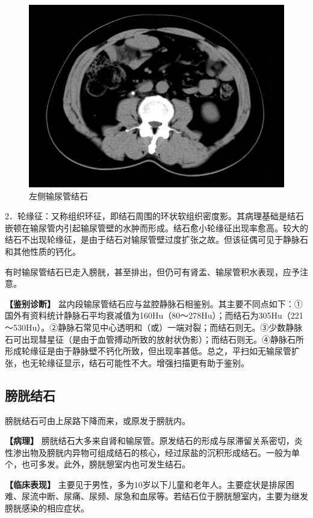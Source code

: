 \begin{figure}[!htbp]
 \centering
 \includegraphics[width=.7\textwidth,height=\textheight,keepaspectratio]{./images/Image00324.jpg}
 \captionsetup{justification=centering}
 \caption{左侧输尿管结石}
 \label{fig15-9}
  \end{figure} 

2．轮缘征：又称组织环征，即结石周围的环状软组织密度影。其病理基础是结石嵌顿在输尿管内引起输尿管壁的水肿而形成。结石愈小轮缘征出现率愈高。较大的结石不出现轮缘征，是由于结石对输尿管壁过度扩张之故。但该征偶可见于静脉石和其他性质的钙化。

有时输尿管结石已走入膀胱，甚至排出，但仍可有肾盂、输尿管积水表现，应予注意。

\textbf{【鉴别诊断】}
盆内段输尿管结石应与盆腔静脉石相鉴别。其主要不同点如下：①国外有资料统计静脉石平均衰减值为160Hu（80～278Hu）；而结石为305Hu（221～530Hu）。②静脉石常见中心透明和（或）一端对裂；而结石则无。③少数静脉石可出现彗星征（是由于血管搏动所致的放射状伪影）；而结石则无。④静脉石所形成轮缘征是由于静脉壁不钙化所致，但出现率甚低。总之，平扫如无输尿管扩张，也无轮缘征显示，结石可能性不大。增强扫描更有助于鉴别。

\subsection{膀胱结石}

膀胱结石可由上尿路下降而来，或原发于膀胱内。

\textbf{【病理】}
膀胱结石大多来自肾和输尿管。原发结石的形成与尿滞留关系密切，炎性渗出物及膀胱内异物可组成结石的核心，经过尿盐的沉积形成结石。一般为单个，也可多发。此外，膀胱憩室内也可发生结石。

\textbf{【临床表现】}
主要见于男性，多为10岁以下儿童和老年人。主要症状是排尿困难、尿流中断、尿痛、尿频、尿急和血尿等。若结石位于膀胱憩室内，主要为继发膀胱感染的相应症状。


